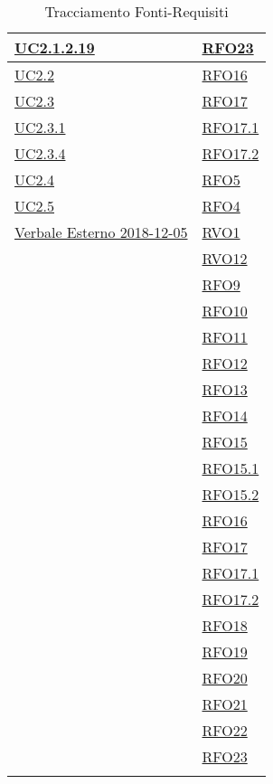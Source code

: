 \begin{longtable}{|>{\centering}m{5cm}|m{5cm}<{\centering}|}
	\hyperref[UC2.1.2.19]{UC2.1.2.19} & \hyperlink{RFO23}{RFO23}\\ \hline
	\hyperref[UC2.2]{UC2.2} & \hyperlink{RFO16}{RFO16}\\ \hline
	\hyperref[UC2.3]{UC2.3} & \hyperlink{RFO17}{RFO17}\\ \hline
	\hyperref[UC2.3.1]{UC2.3.1} & \hyperlink{RFO17.1}{RFO17.1}\\ \hline
	\hyperref[UC2.3.4]{UC2.3.4} & \hyperlink{RFO17.2}{RFO17.2}\\ \hline
	\hyperref[UC2.4]{UC2.4} & \hyperlink{RFO5}{RFO5}\\ \hline
	\hyperref[UC2.5]{UC2.5} & \hyperlink{RFO4}{RFO4}\\ \hline
	\hyperlink{Verbale Esterno 2018-12-05}{Verbale Esterno 2018-12-05} &
      \hyperlink{RVO1}{RVO1}\\ &\hyperlink{RVO12}{RVO12}\\ &\hyperlink{RFO9}{RFO9}\\ & \hyperlink{RFO10}{RFO10}\\ & \hyperlink{RFO11}{RFO11}\\ & \hyperlink{RFO12}{RFO12}\\ & \hyperlink{RFO13}{RFO13}\\ & \hyperlink{RFO14}{RFO14}\\ & \hyperlink{RFO15}{RFO15}\\ & \hyperlink{RFO15.1}{RFO15.1}\\ & \hyperlink{RFO15.2}{RFO15.2}\\ & \hyperlink{RFO16}{RFO16}\\ & \hyperlink{RFO17}{RFO17}\\ & \hyperlink{RFO17.1}{RFO17.1}\\ & 
	\hyperlink{RFO17.2}{RFO17.2}\\ & \hyperlink{RFO18}{RFO18}\\ & \hyperlink{RFO19}{RFO19}\\ & \hyperlink{RFO20}{RFO20}\\ & \hyperlink{RFO21}{RFO21}\\ & \hyperlink{RFO22}{RFO22}\\ & \hyperlink{RFO23}{RFO23}\\ \hline
	\caption[Tracciamento Fonti-Requisiti]{Tracciamento Fonti-Requisiti}
	\label{tabella:fonti-requi}
\end{longtable}
\clearpage


